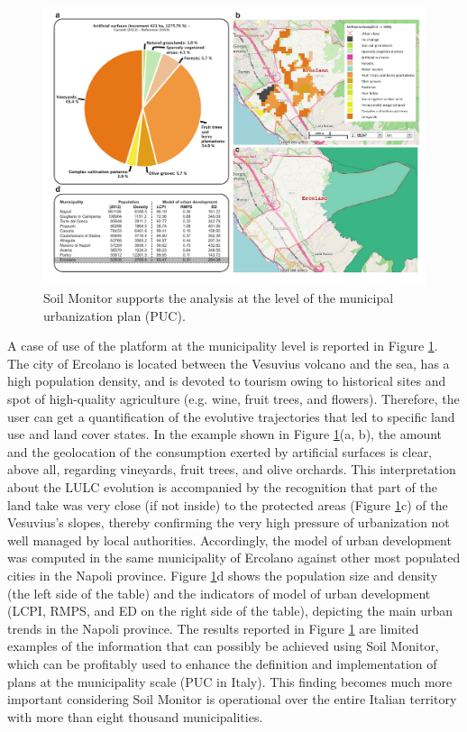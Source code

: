 \documentclass[APA,LATO1COL,doublespace]{WileyNJD-v2}
\begin{document}
\begin{figure}[t]
    \centerline{\includegraphics[width=450pt]{Figure06.pdf}}
    \caption{ Soil Monitor supports the analysis at the level of the municipal urbanization plan (PUC). } \label{fig:caseCOM}
\end{figure}

A case of use of the platform at the municipality level is reported in Figure \ref{fig:caseCOM}. 
The city of Ercolano is located between the Vesuvius volcano and the sea, has a high population density, and is devoted to tourism owing to historical sites and spot of high-quality agriculture (e.g. wine, fruit trees, and flowers). 
Therefore, the user can get a quantification of the evolutive trajectories that led to specific land use and land cover states. 
In the example shown in Figure \ref{fig:caseCOM}(a, b), the amount and the geolocation of the consumption exerted by artificial surfaces is clear, above all, regarding vineyards, fruit trees, and olive orchards. 
This interpretation about the LULC evolution is accompanied by the recognition that part of the land take was very close (if not inside) to the protected areas (Figure \ref{fig:caseCOM}c) of the Vesuvius's slopes, thereby confirming the very high pressure of urbanization not well managed by local authorities.
Accordingly, the model of urban development was computed in the same municipality of Ercolano against other most populated cities in the Napoli province. 
Figure \ref{fig:caseCOM}d shows the population size and density (the left side of the table) and the indicators of model of urban development (LCPI, RMPS, and ED on the right side of the table), depicting the main urban trends in the Napoli province. 
The results reported in Figure \ref{fig:caseCOM} are limited examples of the information that can possibly be achieved using Soil Monitor, which can be profitably used to enhance the definition and implementation of plans at the municipality scale (PUC in Italy). 
This finding becomes much more important considering Soil Monitor is operational over the entire Italian territory with more than eight thousand municipalities.
\end{document}
